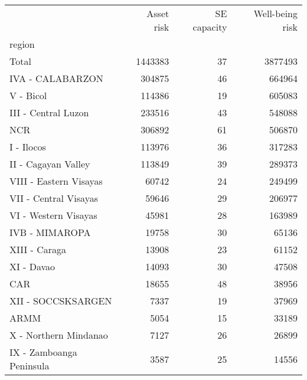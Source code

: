 \begin{tabular}{lrrr}
\toprule
{} &  Asset risk &  SE capacity &  Well-being risk \\
region                   &             &              &                  \\
\midrule
Total                    &     1443383 &           37 &          3877493 \\
IVA - CALABARZON         &      304875 &           46 &           664964 \\
V - Bicol                &      114386 &           19 &           605083 \\
III - Central Luzon      &      233516 &           43 &           548088 \\
NCR                      &      306892 &           61 &           506870 \\
I - Ilocos               &      113976 &           36 &           317283 \\
II - Cagayan Valley      &      113849 &           39 &           289373 \\
VIII - Eastern Visayas   &       60742 &           24 &           249499 \\
VII - Central Visayas    &       59646 &           29 &           206977 \\
VI - Western Visayas     &       45981 &           28 &           163989 \\
IVB - MIMAROPA           &       19758 &           30 &            65136 \\
XIII - Caraga            &       13908 &           23 &            61152 \\
XI - Davao               &       14093 &           30 &            47508 \\
CAR                      &       18655 &           48 &            38956 \\
XII - SOCCSKSARGEN       &        7337 &           19 &            37969 \\
ARMM                     &        5054 &           15 &            33189 \\
X - Northern Mindanao    &        7127 &           26 &            26899 \\
IX - Zamboanga Peninsula &        3587 &           25 &            14556 \\
\bottomrule
\end{tabular}
